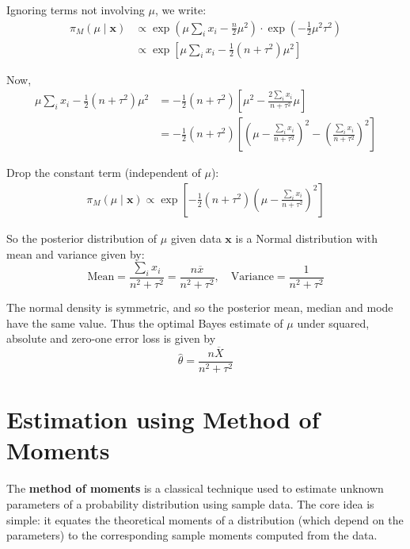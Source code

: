 \documentclass[twoside]{book}
\begin{document}
Ignoring terms not involving $\mu$, we write:
\begin{align*}
\pi_M(\mu \mid \textbf{x})&\propto \exp\left(  \mu \sum_i x_i - \frac{n}{2} \mu^2 \right)
         \cdot \exp\left(  -\frac{1}{2} \mu^2 \tau^2 \right) \\
&\propto \exp\left[
  \mu \sum_i x_i
  - \frac{1}{2}(n + \tau^2)\mu^2
\right]
\end{align*}

Now,
\begin{align*}
\mu \sum_i x_i - \frac{1}{2}(n + \tau^2)\mu^2
&= -\frac{1}{2}(n + \tau^2) \left[
  \mu^2 - \frac{2 \sum_i x_i}{n + \tau^2} \mu
\right] \\
&= -\frac{1}{2}(n + \tau^2) \left[
  \left( \mu - \frac{\sum_i x_i}{n + \tau^2} \right)^2
  - \left( \frac{\sum_i x_i}{n + \tau^2} \right)^2
\right]
\end{align*}

Drop the constant term (independent of $\mu$):
\begin{align*}
\pi_M(\mu \mid \textbf{x})\propto \exp\left[
  -\frac{1}{2}(n + \tau^2) \left(
    \mu - \frac{\sum_i x_i}{n + \tau^2}
  \right)^2
\right]
\end{align*}

So the posterior distribution of $\mu$ given data $ \textbf{x} $ is a Normal distribution with mean and variance given by:
$$\text{Mean} = \frac{\sum_i x_i}{n^2+\tau^2} = \frac{n \overline{x}}{n^2+\tau^2}, \quad \text{Variance} = \frac{1}{n^2+\tau^2}$$


The normal density is symmetric, and so the posterior mean, median and mode have the same value. Thus the optimal Bayes estimate of $\mu$ under squared, absolute and zero-one error loss is given by
$$\hat{\theta} =  \frac{n\overline{X}}{n^2+\tau^2}$$




\section{Estimation using Method of Moments}
The \textbf{method of moments} is a classical technique used to estimate unknown parameters of a probability distribution using sample data. The core idea is simple: it equates the theoretical moments of a distribution (which depend on the parameters) to the corresponding sample moments computed from the data.
\end{document}
